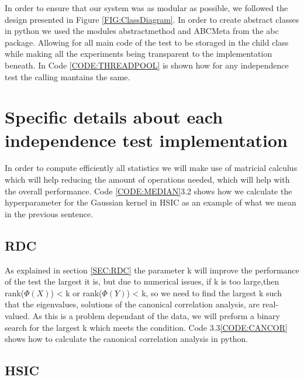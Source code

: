 In order to ensure that our system was as modular as possible, we followed the design presented in Figure \ref{FIG:ClassDiagram}. In order to create abstract classes in python we used the modules abstractmethod and ABCMeta from the abc package. Allowing for all main code of the test to be storaged in the child class while making all the experiments being transparent to the implementation beneath. In Code  \ref{CODE:THREADPOOL} is shown how for any independence test the calling mantains the same.

\section{Specific details about each independence test implementation}

In order to compute efficiently all statistics we will make use of matricial calculus which will help reducing the amount of operations needed, which will help with the overall performance. Code \ref{CODE:MEDIAN}3.2 shows how we calculate the hyperparameter for the Gaussian kernel in HSIC as an example of what we mean in the previous sentence.

\label{CODE:MEDIAN}

\subsection{RDC}

As explained in section \ref{SEC:RDC} the parameter k will improve the performance of the test the largest it is, but due to numerical issues, if k is too large,then rank($\Phi(X)$) < k or rank($\Phi(Y)$) < k, so we need to find the largest k such that the eigenvalues, solutions of the canonical correlation analysis,  are real-valued. As this is a problem dependant of the data, we will preform a binary search for the largest k which meets the condition. Code 3.3\ref{CODE:CANCOR} shows how to calculate the canonical correlation analysis in python.

\label{CODE:CANCOR}




\subsection{HSIC}


